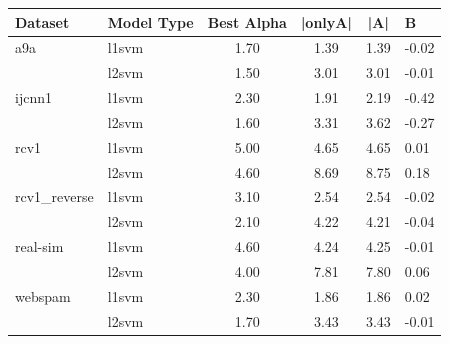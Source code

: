 \begin{tabular}{llccc}
Dataset & Model Type & Best Alpha & |onlyA| & |A| & B \\
\hline
a9a & l1svm & 1.70 & 1.39 & 1.39 & -0.02 \\
 & l2svm & 1.50 & 3.01 & 3.01 & -0.01 \\
\hline
ijcnn1 & l1svm & 2.30 & 1.91 & 2.19 & -0.42 \\
 & l2svm & 1.60 & 3.31 & 3.62 & -0.27 \\
\hline
rcv1 & l1svm & 5.00 & 4.65 & 4.65 & 0.01 \\
 & l2svm & 4.60 & 8.69 & 8.75 & 0.18 \\
\hline
rcv1_reverse & l1svm & 3.10 & 2.54 & 2.54 & -0.02 \\
 & l2svm & 2.10 & 4.22 & 4.21 & -0.04 \\
\hline
real-sim & l1svm & 4.60 & 4.24 & 4.25 & -0.01 \\
 & l2svm & 4.00 & 7.81 & 7.80 & 0.06 \\
\hline
webspam & l1svm & 2.30 & 1.86 & 1.86 & 0.02 \\
 & l2svm & 1.70 & 3.43 & 3.43 & -0.01 \\
\hline
\end{tabular}